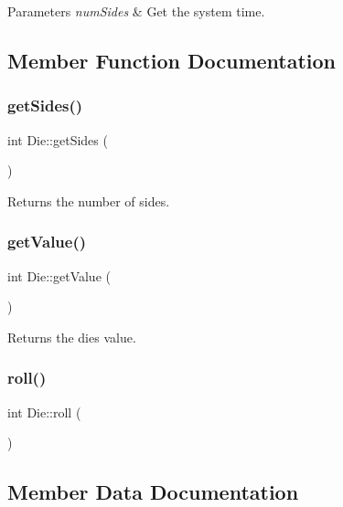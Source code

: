 \begin{DoxyParams}{Parameters}
{\em num\+Sides} & Get the system time. \\
\hline
\end{DoxyParams}


\subsection{Member Function Documentation}
\mbox{\label{class_die_a481ebbb00f5a00163bbf83ff44b13b62}} 
\subsubsection{\texorpdfstring{getSides()}{getSides()}}
{\footnotesize\ttfamily int Die\+::get\+Sides (\begin{DoxyParamCaption}{ }\end{DoxyParamCaption})}

Returns the number of sides. \mbox{\label{class_die_a0a76a3172b8dc96e33f78482cf5f0cd6}} 
\subsubsection{\texorpdfstring{getValue()}{getValue()}}
{\footnotesize\ttfamily int Die\+::get\+Value (\begin{DoxyParamCaption}{ }\end{DoxyParamCaption})}

Returns the die\textquotesingle{}s value. \mbox{\label{class_die_ad62b97478af1158dabe114c486f6824d}} 
\subsubsection{\texorpdfstring{roll()}{roll()}}
{\footnotesize\ttfamily int Die\+::roll (\begin{DoxyParamCaption}{ }\end{DoxyParamCaption})}



\subsection{Member Data Documentation}
\mbox{\label{class_die_a97326323d9e997c9e7ee077ca250a080}} 
